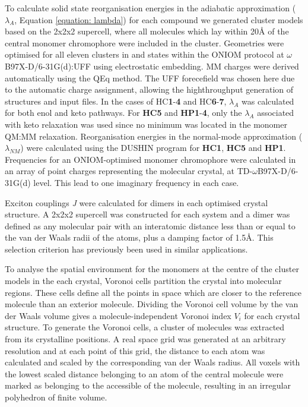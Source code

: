 To calculate solid state reorganisation energies in the adiabatic approximation ($\lambda_{A}$, Equation \ref{equation: lambda}) for each compound we generated cluster models based on the 2x2x2 supercell, where all molecules which lay within 20{\AA} of the central monomer chromophore were included in the cluster. Geometries were optimised for all eleven clusters in \sone{} and \szero{} states within the ONIOM protocol at $\omega$B97X-D/6-31G(d):UFF using electrostatic embedding. MM charges were derived automatically using the QEq method.\cite{Rappe2007} The UFF forecefield was chosen here due to the automatic charge assignment, allowing the highthroughput generation of structures and input files. In the cases of \ac{HC}\textbf{1}-\textbf{4} and \ac{HC}\textbf{6}-\textbf{7}, $\lambda_{A}$ was calculated for both enol and keto pathways. For \textbf{HC5} and \textbf{HP1}-\textbf{4}, only the $\lambda_{A}$ associated with keto relaxation was used since no \Estar{} minimum was located in the monomer QM:MM relaxation. Reorganisation energies in the normal-mode approximation ($\lambda_{NM}$) were calculated using the DUSHIN program for \textbf{HC1}, \textbf{HC5} and \textbf{HP1}.\cite{Reimers2001} Frequencies for an ONIOM-optimised monomer chromophore were calculated in an array of point charges representing the molecular crystal, at TD-$\omega$B97X-D/6-31G(d) level. This lead to one imaginary frequency in each case.

Exciton couplings \textit{J} were calculated for dimers in each optimised crystal structure. A 2x2x2 supercell was constructed for each system and a dimer was defined as any molecular pair with an interatomic distance less than or equal to the van der Waals radii of the atoms, plus a damping factor of 1.5\AA. This selection criterion has previously been used in similar applications.\cite{Campbell2017} 

To analyse the spatial environment for the monomers at the centre of the cluster models in the each crystal, Voronoi cells partition the crystal into molecular regions. These cells define all the points in space which are closer to the reference molecule than an exterior molecule. Dividing the Voronoi cell volume by the van der Waals volume gives a molecule-independent Voronoi index $V_{i}$ for each crystal structure. To generate the Voronoi cells, a cluster of molecules was extracted from its crystalline positions. A real space grid was generated at an arbitrary resolution and at each point of this grid, the distance to each atom was calculated and scaled by the corresponding van der Waals radius. All voxels with the lowest scaled distance belonging to an atom of the central molecule were marked as belonging to the accessible of the molecule, resulting in an irregular polyhedron of finite volume.
